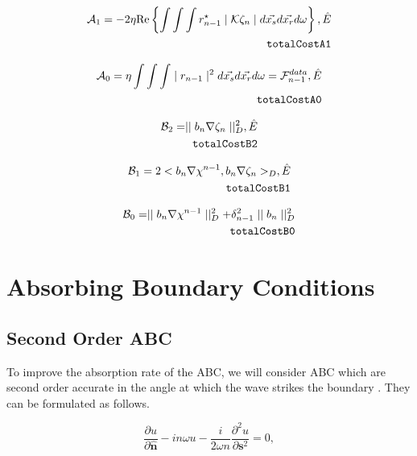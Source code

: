 \documentclass[10pt,a4paper]{article}
\newcommand{\real}[1]{\text{Re} \left\{ #1 \right\}}
\newcommand{\n}{\mathbf{n}}
\newcommand{\s}{\mathbf{s}}
\begin{document}
\begin{align} \label{eq:totalCostA1} \mathcal{A}_1 = -2 \eta \real{\int
\int \int r^{\star}_{n-1} \mid \mathcal{K} \zeta_n \mid
d\vec{x_s}d\vec{x_r}d\omega} , \hat{E}\\
\tag*{\texttt{totalCostA1}}
\end{align}

\begin{align} \label{eq:totalCostA0} \mathcal{A}_0 = \eta \int \int \int
\mid r_{n-1} \mid^2 d\vec{x_s}d\vec{x_r}d\omega =
\mathcal{F}^{data}_{n-1} , \hat{E}\\
\tag*{\texttt{totalCostA0}}
 \end{align}

\begin{align} \label{eq:totalCostB2} \mathcal{B}_2 = \mid \mid b_n \nabla
\zeta_n \mid \mid^{2}_D , \hat{E}\\
\tag*{\texttt{totalCostB2}}
\end{align}

\begin{align} \label{eq:totalCostB1} \mathcal{B}_1 = 2 < b_n
\nabla\chi^{n-1}, b_n \nabla \zeta_n >_D, \hat{E}\\
\tag*{\texttt{totalCostB1}}
\end{align}

\begin{align} \label{eq:totalCostB0} \mathcal{B}_0 = \mid \mid b_n \nabla
\chi^{n-1} \mid \mid^{2}_D + \delta^{2}_{n-1} \mid \mid b_n \mid
\mid^{2}_D\\
\tag*{\texttt{totalCostB0}}
\end{align}

\section{Absorbing Boundary Conditions}\label{sec:ABC}
\subsection{Second Order ABC}
To improve the absorption rate of the ABC, we will consider ABC which are second order accurate in the angle at which the wave strikes the boundary \cite{AbsorpationRates}. They can be formulated as follows.

\begin{equation} \label{eqn:SecondOrderABC}
\frac{\partial u}{\partial \hat{\n}} - in\omega u - \frac{i}{2\omega n}\frac{\partial^2 u}{\partial \s^2}=0,
\end{equation}
\end{document}
